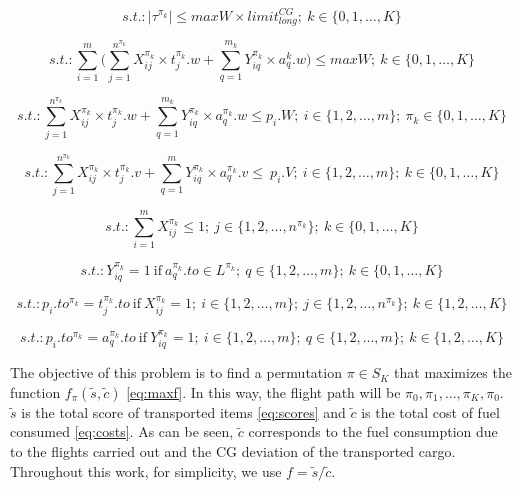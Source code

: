 \documentclass[preprint,authoryear]{elsarticle}
\begin{document}
\begin{equation} \label{eq:torqlong}
	s.t.: \Big | \tau^{\pi_k} \Big | \leq maxW \times limit^{CG}_{long};\ k \in \{0, 1, \ldots, K\}
\end{equation}

\begin{equation} \label{eq:payload}
	s.t.: \sum_{i=1}^{m} \Big (\sum_{j=1}^{n^{\pi_k}} X_{ij}^{\pi_k} \times t_j^{\pi_k}.w + \sum_{q=1}^{m_k} Y_{iq}^{\pi_k} \times a_q^k.w \Big ) \leq maxW; \ k \in \{0, 1, \ldots, K\}
\end{equation}

\begin{equation} \label{eq:app2}
	s.t.: \sum_{j=1}^{n^{\pi_k}} X_{ij}^{\pi_k} \times t_j^{\pi_k}.w + \sum_{q=1}^{m_k} Y_{iq}^{\pi_k} \times a_q^{\pi_k}.w  \leq p_i.W; \ i \in \{1, 2, \ldots, m\}; \ {\pi_k} \in \{0, 1, \ldots, K\}
\end{equation}

\begin{equation} \label{eq:app3}
	s.t.: \sum_{j=1}^{n^{\pi_k}} X_{ij}^{\pi_k} \times t_j^{\pi_k}.v + \sum_{q=1}^{m} Y_{iq}^{\pi_k} \times a_q^{\pi_k}.v  \leq\ p_i.V; \ i \in \{1, 2, \ldots, m\}; \ k \in \{0, 1, \ldots, K\}
\end{equation}

\begin{equation} \label{eq:app4}
	s.t.: \sum_{i=1}^{m} X_{ij}^{\pi_k} \leq 1; \ j \in \{1, 2, \ldots, n^{\pi_k}\}; \ k \in \{0, 1, \ldots, K\}
\end{equation}

\begin{equation} \label{eq:app5}
	s.t.:  Y_{iq}^{\pi_k} = 1 \ \mbox{if} \ a^{\pi_k}_q.to \in L^{\pi_k}; \ q \in \{1, 2, \ldots, m\}; \ k \in \{0, 1, \ldots, K\}
\end{equation}

\begin{equation} \label{eq:pdp8}
	s.t.: p_i.to^{\pi_k} = t^{\pi_k}_j.to\ \mbox{if} \ X_{ij}^{\pi_k} = 1; \ i \in \{1, 2, \ldots, m\}; \ j \in \{1, 2, \ldots, n^{\pi_k}\}; \ k \in \{1, 2, \ldots, K\}
\end{equation}

\begin{equation} \label{eq:pdp2}
	s.t.:  p_i.to^{\pi_k} = a^{\pi_k}_q.to\ \mbox{if} \ Y_{iq}^{\pi_k} = 1; \ i \in \{1, 2, \ldots, m\};\ q \in \{1, 2, \ldots, m\}; \ k \in \{1, 2, \ldots, K\}
\end{equation}


The objective of this problem is to find a permutation $\pi \in S_K$\/ that maximizes the function $f_\pi(\tilde{s},\tilde{c})$ \ref{eq:maxf}. In this way, the flight path will be $\pi_0, \pi_1, \ldots, \pi_K, \pi_0$. $\tilde{s}$\/ is the total score of transported items \ref{eq:scores} and  $\tilde{c}$\/ is the total cost of fuel consumed \ref{eq:costs}. As can be seen, $\tilde{c}$\/ corresponds to the fuel consumption due to the flights carried out and the CG deviation of the transported cargo. Throughout this work, for simplicity, we use $f=\tilde{s}/\tilde{c}$.
\end{document}

